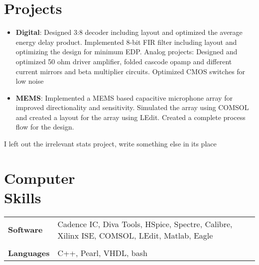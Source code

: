 \documentclass[margin]{res}
\begin{document}
\begin{resume}
\section{Projects}
\begin{itemize}
\item
{\bf Digital}: Designed 3:8 decoder including layout and optimized the average energy delay product. Implemented 8-bit FIR filter including layout and optimizing the design for minimum EDP.
Analog projects: Designed and optimized 50 ohm driver amplifier, folded cascode opamp and different current mirrors and beta multiplier circuits. Optimized CMOS switches for low noise
\item
{\bf MEMS}: Implemented a MEMS based capacitive microphone array for improved directionality and sensitivity. Simulated the array using COMSOL and created a layout for the array using LEdit. Created a complete process flow for the design.
\end{itemize}

I left out the irrelevant stats project, write something else in its place

\section{Computer \\ Skills}
   \begin{tabular}{l p{3.5in}}
     	{\bf Software} &  Cadence IC, Diva Tools, HSpice, Spectre, Calibre, Xilinx ISE, COMSOL, LEdit, Matlab, Eagle \\\\
	{\bf Languages} & C++, Pearl, VHDL, bash
 \end{tabular}

\end{resume} 
\end{document}
